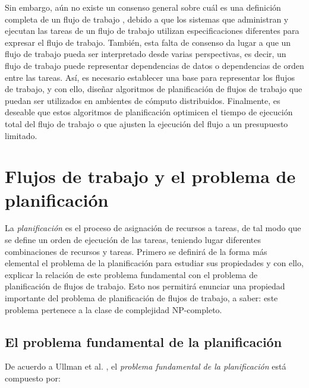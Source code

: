 Sin embargo, aún no existe un consenso general sobre cuál es una definición completa de un flujo de trabajo \cite{van2003workflow}, debido a que los sistemas que administran y ejecutan las tareas de un flujo de trabajo utilizan especificaciones diferentes para expresar el flujo de trabajo. También, esta falta de consenso da lugar a que un flujo de trabajo pueda ser interpretado desde varias perspectivas, es decir, un flujo de trabajo puede representar dependencias de datos o dependencias de orden entre las tareas. Así, es necesario establecer una base para representar los flujos de trabajo, y con ello, diseñar algoritmos de planificación de flujos de trabajo que puedan ser utilizados en ambientes de cómputo distribuidos. Finalmente, es deseable que estos algoritmos de planificación optimicen el tiempo de ejecución total del flujo de trabajo o que ajusten la ejecución del flujo a un presupuesto limitado.




\section{Flujos de trabajo y el problema de planificación} 
\label{secc:definitions}

La \emph{planificación} es el proceso de asignación de recursos a tareas, de tal modo que se define un orden de ejecución de las tareas, teniendo lugar diferentes combinaciones de recursos y tareas. Primero se definirá de la forma más elemental el problema de la planificación para estudiar sus propiedades y con ello, explicar la relación de este problema fundamental con el problema de planificación de flujos de trabajo. Esto nos permitirá enunciar una propiedad importante del problema de planificación de flujos de trabajo, a saber: este problema pertenece a la clase de complejidad NP-completo.


\subsection{El problema fundamental de la planificación}
De acuerdo a  Ullman et al. \cite{ullman1975np}, el \emph{problema fundamental de la planificación} está compuesto por:
 
